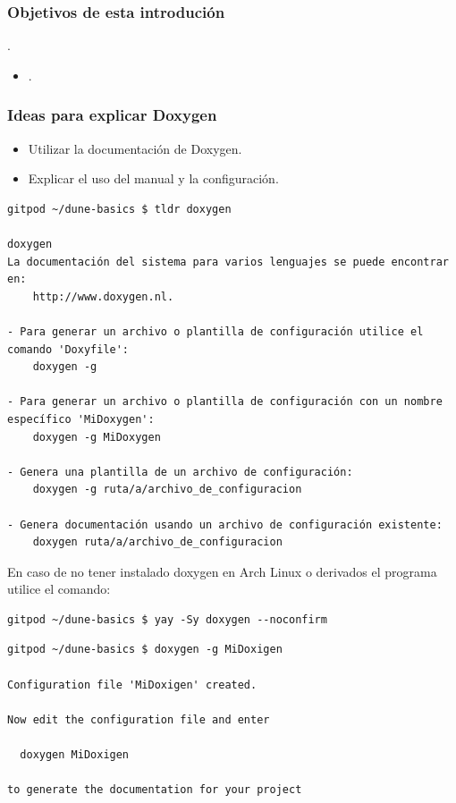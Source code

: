 




\begin{frame}
	\frametitle{Objetivos de esta introdución}
	.
	\begin{itemize}
		\item .
	\end{itemize}
\end{frame}

\begin{frame}
	\frametitle{Ideas para explicar Doxygen}
	\begin{itemize}
		\item Utilizar la documentación de Doxygen.
		\item Explicar el uso del manual y la configuración.
	\end{itemize}
\end{frame}

\begin{frame}[fragile]\LARGE
	\begin{lstlisting}
gitpod ~/dune-basics $ tldr doxygen

doxygen
La documentación del sistema para varios lenguajes se puede encontrar en: 
	http://www.doxygen.nl.

- Para generar un archivo o plantilla de configuración utilice el comando 'Doxyfile':
	doxygen -g

- Para generar un archivo o plantilla de configuración con un nombre específico 'MiDoxygen':
	doxygen -g MiDoxygen

- Genera una plantilla de un archivo de configuración:
	doxygen -g ruta/a/archivo_de_configuracion

- Genera documentación usando un archivo de configuración existente:
	doxygen ruta/a/archivo_de_configuracion
\end{lstlisting}
\end{frame}

\begin{frame}[fragile]
	En caso de no tener instalado doxygen en Arch Linux o derivados el programa utilice el comando:\LARGE
	\begin{lstlisting}
gitpod ~/dune-basics $ yay -Sy doxygen --noconfirm
\end{lstlisting}

	\begin{lstlisting}
gitpod ~/dune-basics $ doxygen -g MiDoxigen

Configuration file 'MiDoxigen' created.

Now edit the configuration file and enter

  doxygen MiDoxigen

to generate the documentation for your project
\end{lstlisting}
\end{frame}

